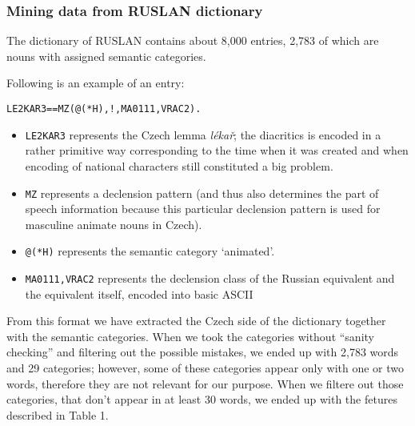 \documentclass[letterpaper]{article}
\begin{document}
\subsubsection{Mining data from RUSLAN dictionary}

The dictionary of RUSLAN contains about 8,000 entries, 2,783 of which are nouns with assigned semantic categories.

Following is an example of an entry:

\begin{verbatim}
LE2KAR3==MZ(@(*H),!,MA0111,VRAC2).
\end{verbatim}

\begin{itemize}
\item \texttt{LE2KAR3} represents the Czech lemma \emph{l\'{e}ka\v{r}}; the diacritics is encoded in a rather primitive way corresponding to the time when it was created and when encoding of national characters still constituted a big problem.
\item \texttt{MZ} represents a declension pattern (and thus also determines the part of speech information because this particular declension pattern is used for masculine animate nouns in Czech).
\item \texttt{@(*H)} represents the semantic category `animated'.
\item \texttt{MA0111,VRAC2} represents the declension class of the Russian equivalent and the equivalent itself, encoded into basic ASCII
\end{itemize}

From this format we have extracted the Czech side of the dictionary together with the semantic categories. 
When we took the categories without ``sanity checking'' and filtering out the possible mistakes, 
we ended up with 2,783 words and 29 categories; however, some of these categories appear only with one or two words, therefore they are not relevant for our purpose. When we filtere out those categories, that don't appear in at least 30 words, we ended up with the fetures described in Table 1.
\end{document}
